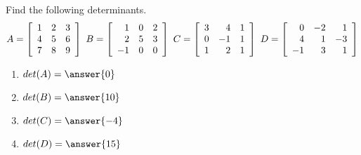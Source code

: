 \documentclass{ximera}
\begin{document}
\begin{problem}
  Find the following determinants.
  \begin{equation*}
    A=\startmat{rrr}
      1 & 2 & 3 \\
      4 & 5 & 6 \\
      7 & 8 & 9 \\
    \stopmat
    \quad
    B=\startmat{rrr}
      1  & 0 & 2 \\
      2  & 5 & 3 \\
      -1 & 0 & 0 \\
    \stopmat
    \quad
    C=\startmat{rrr}
      3 &  4 & 1 \\
      0 & -1 & 1 \\
      1 &  2 & 1 \\
    \stopmat
    \quad
    D=\startmat{rrr}
      0  & -2 &  1 \\
      4  & 1  & -3 \\
      -1 & 3  &  1 \\
    \stopmat
  \end{equation*}

  \begin{enumerate}
    \item $det(A)=\answer{0}$
    \item $det(B)=\answer{10}$
    \item $det(C)=\answer{-4}$
    \item $det(D)=\answer{15}$
  \end{enumerate}
\end{problem}
\end{document}
